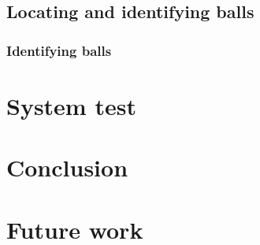 
	\section{Locating and identifying balls}
		\label{sec:balls-intro}	
			
		
		
			\subsection{Identifying balls}
				\label{sec:balls-id}
				

\chapter{System test}
	\label{sec:system-test}
	
	
\chapter{Conclusion}
	\label{sec:conclusion}
	
	
\chapter{Future work}
	\label{sec:futurework}
	





